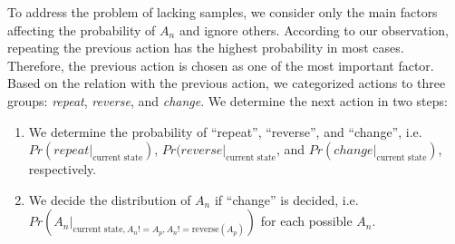 To address the problem of lacking samples, we consider only the main factors 
affecting the probability of $A_n$ and ignore others. 
According to our observation, 
repeating the previous action has the highest probability in most cases. 
Therefore, the previous action is chosen as one of the most important factor. 
Based on the relation with the previous action, we categorized actions to three groups: 
\textit{repeat}, \textit{reverse}, and \textit{change}. 
We determine the next action in two steps:
\begin{enumerate}
    \item We determine the probability of ``repeat'', ``reverse'', and ``change'',
        i.e. $Pr(repeat|_{\textrm{current state}})$, 
        $Pr(reverse|_{\textrm{current state}}$, 
        and $Pr(change|_{\textrm{current state}})$,
        respectively. 
    \item We decide the distribution of $A_n$ if ``change'' is decided, 
        i.e. $Pr(A_n |_{\textrm{current state}, A_n != A_p, A_n != \textrm{reverse}(A_p)})$ 
        for each possible $A_n$. 
\end{enumerate}




